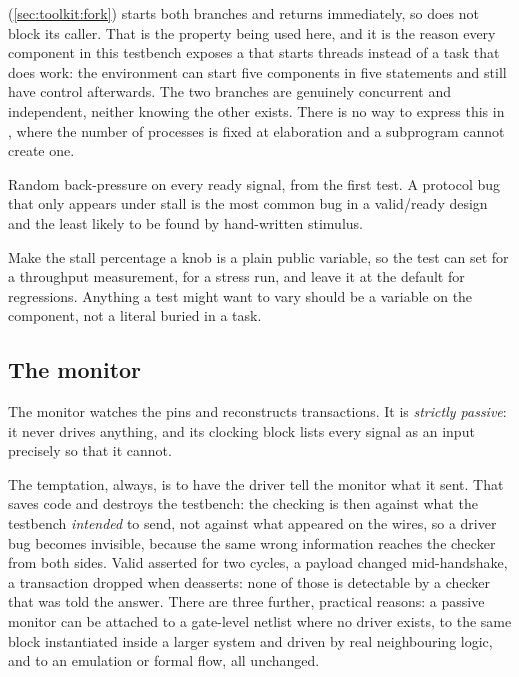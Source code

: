  (\cref{sec:toolkit:fork}) starts both branches and returns
immediately, so  does not block its caller. That is the property
being used here, and it is the reason every component in this testbench
exposes a  that starts threads instead of a task that does work:
the environment can start five components in five statements and still have
control afterwards. The two branches are genuinely concurrent and independent,
neither knowing the other exists. There is no way to express this in \VHDL{},
where the number of processes is fixed at elaboration and a subprogram cannot
create one.

\begin{ruleofthumb}
Random back-pressure on every ready signal, from the first test. A protocol bug
that only appears under stall is the most common bug in a valid/ready design
and the least likely to be found by hand-written stimulus.
\end{ruleofthumb}

\begin{tipbox}{Make the stall percentage a knob}
 is a plain public variable, so the test can set
 for a throughput measurement,  for a
stress run, and leave it at the default for regressions. Anything a test might
want to vary should be a variable on the component, not a literal buried in a
task.
\end{tipbox}

\subsection{The monitor}

The monitor watches the pins and reconstructs transactions. It
is \emph{strictly passive}: it never drives anything, and its clocking block
 lists every signal as an input precisely so that it cannot.

The temptation, always, is to have the driver tell the monitor what it sent.
That saves code and destroys the testbench: the checking is then against what
the testbench \emph{intended} to send, not against what appeared on the wires,
so a driver bug becomes invisible, because the same wrong information reaches
the checker from both sides. Valid asserted for two cycles, a payload changed
mid-handshake, a transaction dropped when  deasserts: none of
those is detectable by a checker that was told the answer. There are three
further, practical reasons: a passive monitor can
be attached to a gate-level netlist where no driver exists, to the same block
instantiated inside a larger system and driven by real neighbouring logic, and
to an emulation or formal flow, all unchanged.

